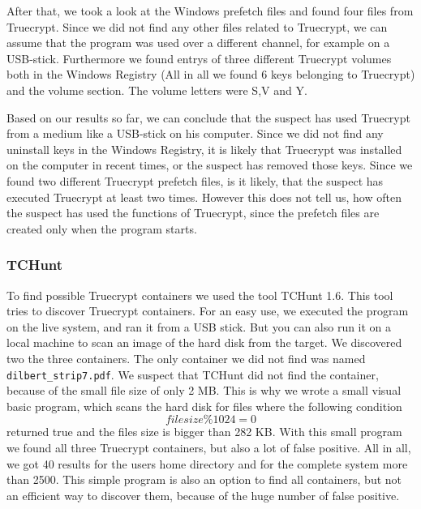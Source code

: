 After that, we took a look at the Windows prefetch files and found four files from Truecrypt. 
Since we did not find any other files related to Truecrypt, we can assume that the program was used over a different channel, for example on a USB-stick. 
Furthermore we found entrys of three different Truecrypt volumes both in the  Windows Registry (All in all we found 6 keys belonging to Truecrypt) and the volume section. 
The volume letters were S,V and Y.

Based on our results so far, we can conclude that the suspect has used Truecrypt from a medium like a USB-stick on his computer. 
Since we did not find any uninstall keys in the  Windows Registry, it is likely that Truecrypt was installed on the computer in recent times, or the suspect has removed those keys. 
Since we found two different Truecrypt prefetch files, is it likely, that the suspect has executed Truecrypt at least two times. 
However this does not tell us, how often the suspect has used the functions of Truecrypt, since the prefetch files are created only when the program starts.

\subsubsection{TCHunt}
To find possible Truecrypt containers we used the tool TCHunt 1.6. 
This tool tries to discover Truecrypt containers. 
For an easy use, we executed the program on the live system, and ran it from a USB stick. 
But you can also run it on a local machine to scan an image of the hard disk from the target. 
We discovered two the three containers. 
The only container we did not find was named \texttt{dilbert\_strip7.pdf}. 
We suspect that TCHunt did not find the container, because of the small file size of only 2 MB. 
This is why we wrote a small visual basic program, which scans the hard disk for files where the following condition  \[filesize \% 1024 = 0\] returned true and the files size is bigger than 282 KB. 
With this small program we found all three Truecrypt containers, but also a lot of false positive. 
All in all, we got 40 results for the users home directory and for the complete system more than 2500. 
This simple program is also an option to find all containers, but not an efficient way to discover them, because of the huge number of false positive.  


